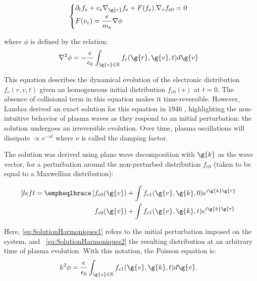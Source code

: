 \begin{equation}
\label{eq:Vlasov}
  \left\{
      \begin{aligned}
     &\partial_{t} f_e + v_e \nabla_{\g{r}} f_e + F(f_e).\nabla_{v}f_{e0} = 0\\
     & F(v_e) = \frac{e}{m_e}\nabla \phi\\
      \end{aligned}
    \right.
\end{equation}

\noindent where $\phi$ is defined by the relation:
\begin{equation}
\nabla^2 \phi = -\frac{e}{\epsilon_0}\int_{\g{v}\in \mathbb{R}}f_{e}(\g{r},\g{v},t)d\g{v}
\end{equation}


\noindent This equation describes the dynamical evolution of the electronic distribution $f_e(r,v,t)$ given an homogeneous initial distribution $f_{e0}(v)$  at $t=0$. The absence of collisional term in this equation makes it time-reversible. However, Landau derived an exact solution for this equation in 1946 \cite{landau1946vibrations}, highlighting the non-intuitive behavior of plasma waves as they respond to an initial perturbation: the solution undergoes an irreversible evolution. Over time, plasma oscillations will dissipate $\propto e^{-\nu t}$ where $\nu$ is called the damping factor.

\noindent The solution was derived using plane wave decomposition with $\g{k}$ as the wave vector, for a perturbation around the non-perturbed distribution $f_{e0}$ (taken to be equal to a Maxwellian distribution):

\begin{subequations}
\label{eq:SolutionHarmoniques}
\begin{align}[left = \empheqlbrace\,]
&f_{e0}(\g{v}) + \int f_{e1}(\g{v},\g{k},0)e^{i\g{k}\g{r}}\label{eq:SolutionHarmoniques1}\\
&f_{e0}(\g{v}) + \int f_{e1}(\g{v},\g{k},t)e^{i\g{k}\g{r}}\label{eq:SolutionHarmoniques2}
\end{align}
\end{subequations}


\noindent  Here, \ref{eq:SolutionHarmoniques1} refers to the initial perturbation imposed on the system, and ~\ref{eq:SolutionHarmoniques2} the resulting distribution at an arbitrary time of plasma evolution. With this notation, the Poisson equation is:
\begin{equation}
k^2 \phi =  \frac{e}{\epsilon_0}\int_{\g{v}\in \mathbb{R}}f_{e1}(\g{v},\g{k},t)d\g{v}.
\end{equation}


